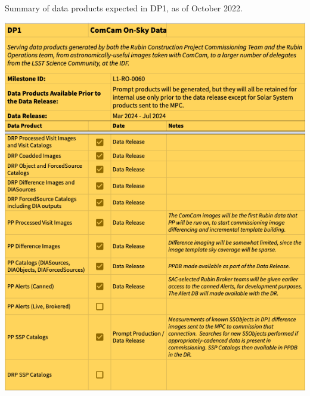 \begin{table}
\caption{Summary of data products expected in DP1, as of October 2022.}
\label{tab:dp-one-products}
\includegraphics[width=\linewidth]{figures/DP1-products}
\end{table}

